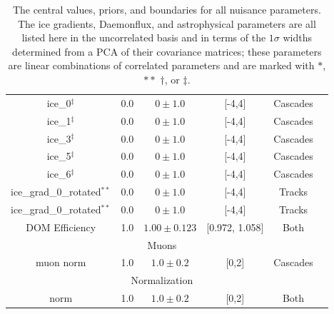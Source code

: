 \documentclass[main.tex]{subfiles}
\begin{document}
\begin{table}
\begin{tabular}{c | ccccc}
        ice\_0$^{\ddag}$ & 0.0 & $0\pm 1.0$ & [-4,4]&Cascades & \\
        ice\_1$^{\ddag}$ & 0.0 & $0\pm 1.0$ & [-4,4]&Cascades & \\
        ice\_3$^{\ddag}$ & 0.0 & $0\pm 1.0$ & [-4,4]&Cascades & \\
        ice\_5$^{\ddag}$ & 0.0 & $0\pm 1.0$ & [-4,4]&Cascades & \\
        ice\_6$^{\ddag}$ & 0.0 & $0\pm 1.0$ & [-4,4]&Cascades & \\
        ice\_grad\_0\_rotated$^{**}$ & 0.0 & $0\pm 1.0$ & [-4,4] & Tracks & \\
        ice\_grad\_0\_rotated$^{**}$ & 0.0 & $0\pm 1.0$ & [-4,4]& Tracks & \\
        DOM Efficiency & 1.0 & $1.00\pm0.123$ & [0.972, 1.058] & Both & \\
        \multicolumn{5}{c}{Muons} \\\hline
        muon norm & 1.0 & $1.0\pm0.2$ & [0,2] & Cascades & \\
        \multicolumn{5}{c}{Normalization} \\\hline
        norm & 1.0 & $1.0\pm0.2$ & [0,2] & Both & 
    \end{tabular}
    \caption{The central values, priors, and boundaries for all nuisance parameters. The ice gradients, Daemonflux, and astrophysical parameters are all listed here in the uncorrelated basis and in terms of the $1\sigma$ widths determined from a PCA of their covariance matrices; these parameters are linear combinations of correlated parameters and are marked with $*$,$**$ $\dag$, or $\ddag$.}\label{table:nutrition}
\end{table}
\fi
\end{document}
